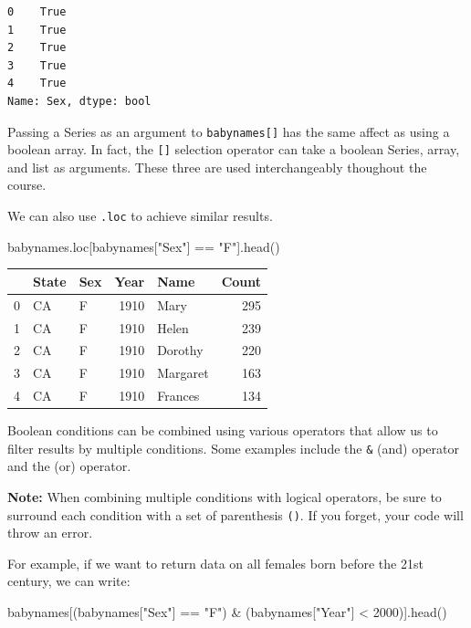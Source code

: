 \documentclass[
  letterpaper,
  DIV=11,
  numbers=noendperiod]{scrreprt}
\newenvironment{Shaded}{\begin{snugshade}}{\end{snugshade}}
\newcommand{\DecValTok}[1]{\textcolor[rgb]{0.68,0.00,0.00}{#1}}
\newcommand{\NormalTok}[1]{\textcolor[rgb]{0.00,0.23,0.31}{#1}}
\newcommand{\OperatorTok}[1]{\textcolor[rgb]{0.37,0.37,0.37}{#1}}
\newcommand{\StringTok}[1]{\textcolor[rgb]{0.13,0.47,0.30}{#1}}
\begin{document}
\begin{verbatim}
0    True
1    True
2    True
3    True
4    True
Name: Sex, dtype: bool
\end{verbatim}

Passing a Series as an argument to \texttt{babynames{[}{]}} has the same
affect as using a boolean array. In fact, the \texttt{{[}{]}} selection
operator can take a boolean Series, array, and list as arguments. These
three are used interchangeably thoughout the course.

We can also use \texttt{.loc} to achieve similar results.

\begin{Shaded}
\begin{Highlighting}[]
\NormalTok{babynames.loc[babynames[}\StringTok{"Sex"}\NormalTok{] }\OperatorTok{==} \StringTok{"F"}\NormalTok{].head()}
\end{Highlighting}
\end{Shaded}

\begin{tabular}{lllrlr}
\toprule
{} & State & Sex &  Year &      Name &  Count \\
\midrule
0 &    CA &   F &  1910 &      Mary &    295 \\
1 &    CA &   F &  1910 &     Helen &    239 \\
2 &    CA &   F &  1910 &   Dorothy &    220 \\
3 &    CA &   F &  1910 &  Margaret &    163 \\
4 &    CA &   F &  1910 &   Frances &    134 \\
\bottomrule
\end{tabular}

Boolean conditions can be combined using various operators that allow us
to filter results by multiple conditions. Some examples include the
\texttt{\&} (and) operator and the \texttt{\textbar{}} (or) operator.

\textbf{Note:} When combining multiple conditions with logical
operators, be sure to surround each condition with a set of parenthesis
\texttt{()}. If you forget, your code will throw an error.

For example, if we want to return data on all females born before the
21st century, we can write:

\begin{Shaded}
\begin{Highlighting}[]
\NormalTok{babynames[(babynames[}\StringTok{"Sex"}\NormalTok{] }\OperatorTok{==} \StringTok{"F"}\NormalTok{) }\OperatorTok{\&}\NormalTok{ (babynames[}\StringTok{"Year"}\NormalTok{] }\OperatorTok{\textless{}} \DecValTok{2000}\NormalTok{)].head()}
\end{Highlighting}
\end{Shaded}
\end{document}
